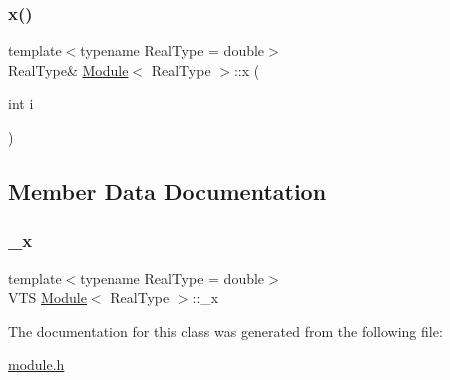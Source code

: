 \mbox{\label{class_module_adb7d9d50d85d8a2bdae6351ed7d57de8}} 
\subsubsection{\texorpdfstring{x()}{x()}\hspace{0.1cm}{\footnotesize\ttfamily [2/2]}}
{\footnotesize\ttfamily template$<$typename Real\+Type  = double$>$ \\
Real\+Type\& \mbox{\hyperlink{class_module}{Module}}$<$ Real\+Type $>$\+::x (\begin{DoxyParamCaption}\item[{int}]{i }\end{DoxyParamCaption})\hspace{0.3cm}{\ttfamily [inline]}}



\subsection{Member Data Documentation}
\mbox{\label{class_module_a9216c72f81ec2827dad07d3e6752af6e}} 
\subsubsection{\texorpdfstring{\+\_\+x}{\_x}}
{\footnotesize\ttfamily template$<$typename Real\+Type  = double$>$ \\
V\+TS \mbox{\hyperlink{class_module}{Module}}$<$ Real\+Type $>$\+::\+\_\+x\hspace{0.3cm}{\ttfamily [protected]}}



The documentation for this class was generated from the following file\+:\begin{DoxyCompactItemize}
\item 
\mbox{\hyperlink{module_8h}{module.\+h}}\end{DoxyCompactItemize}
